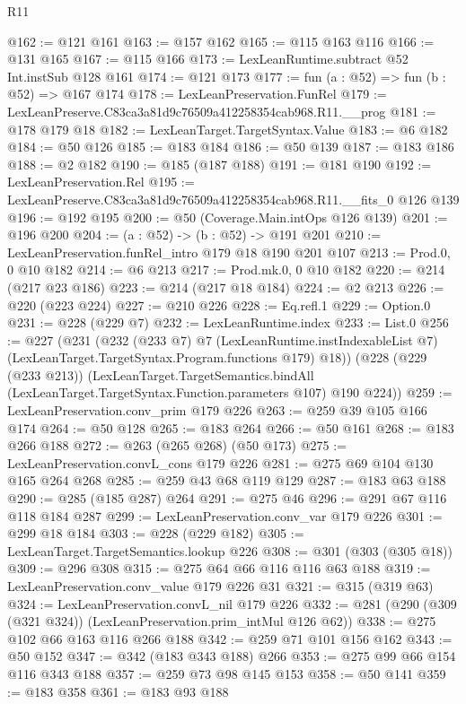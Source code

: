 \begin{lexlean}{R11}
\begin{coremodule}
@162 := @121 @161
@163 := @157 @162
@165 := @115 @163 @116
@166 := @131 @165
@167 := @115 @166
@173 := LexLeanRuntime.subtract @52 Int.instSub @128 @161
@174 := @121 @173
@177 := fun (a : @52) => fun (b : @52) => @167 @174
@178 := LexLeanPreservation.FunRel
@179 := LexLeanPreserve.C83ca3a81d9c76509a412258354cab968.R11.__prog
@181 := @178 @179 @18
@182 := LexLeanTarget.TargetSyntax.Value
@183 := @6 @182
@184 := @50 @126
@185 := @183 @184
@186 := @50 @139
@187 := @183 @186
@188 := @2 @182
@190 := @185 (@187 @188)
@191 := @181 @190
@192 := LexLeanPreservation.Rel
@195 := LexLeanPreserve.C83ca3a81d9c76509a412258354cab968.R11.__fits_0 @126 @139
@196 := @192 @195
@200 := @50 (Coverage.Main.intOps @126 @139)
@201 := @196 @200
@204 := (a : @52) -> (b : @52) -> @191 @201
@210 := LexLeanPreservation.funRel_intro @179 @18 @190 @201 @107
@213 := Prod.{0, 0} @10 @182
@214 := @6 @213
@217 := Prod.mk.{0, 0} @10 @182
@220 := @214 (@217 @23 @186)
@223 := @214 (@217 @18 @184)
@224 := @2 @213
@226 := @220 (@223 @224)
@227 := @210 @226
@228 := Eq.refl.{1}
@229 := Option.{0}
@231 := @228 (@229 @7)
@232 := LexLeanRuntime.index
@233 := List.{0}
@256 := @227
    (@231
      (@232
        (@233 @7)
        @7
        (LexLeanRuntime.instIndexableList @7)
        (LexLeanTarget.TargetSyntax.Program.functions @179)
        @18))
    (@228
      (@229 (@233 @213))
      (LexLeanTarget.TargetSemantics.bindAll
        (LexLeanTarget.TargetSyntax.Function.parameters @107)
        @190
        @224))
@259 := LexLeanPreservation.conv_prim @179 @226
@263 := @259 @39 @105 @166 @174
@264 := @50 @128
@265 := @183 @264
@266 := @50 @161
@268 := @183 @266 @188
@272 := @263 (@265 @268) (@50 @173)
@275 := LexLeanPreservation.convL_cons @179 @226
@281 := @275 @69 @104 @130 @165 @264 @268
@285 := @259 @43 @68 @119 @129
@287 := @183 @63 @188
@290 := @285 (@185 @287) @264
@291 := @275 @46
@296 := @291 @67 @116 @118 @184 @287
@299 := LexLeanPreservation.conv_var @179 @226
@301 := @299 @18 @184
@303 := @228 (@229 @182)
@305 := LexLeanTarget.TargetSemantics.lookup @226
@308 := @301 (@303 (@305 @18))
@309 := @296 @308
@315 := @275 @64 @66 @116 @116 @63 @188
@319 := LexLeanPreservation.conv_value @179 @226 @31
@321 := @315 (@319 @63)
@324 := LexLeanPreservation.convL_nil @179 @226
@332 := @281 (@290 (@309 (@321 @324)) (LexLeanPreservation.prim_intMul @126 @62))
@338 := @275 @102 @66 @163 @116 @266 @188
@342 := @259 @71 @101 @156 @162
@343 := @50 @152
@347 := @342 (@183 @343 @188) @266
@353 := @275 @99 @66 @154 @116 @343 @188
@357 := @259 @73 @98 @145 @153
@358 := @50 @141
@359 := @183 @358
@361 := @183 @93 @188

\end{coremodule}
\end{lexlean}
